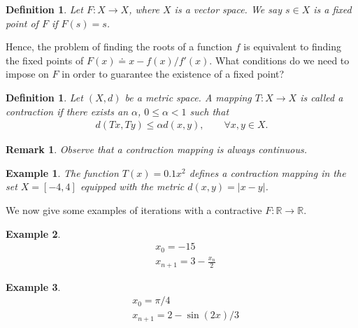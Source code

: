 \documentclass[12pt,reqno]{amsart}
\numberwithin{equation}{section}  %
\newcommand{\rr}{\mathbb{R}}
\newtheorem{definition}[theorem]{Definition}
\newtheorem{remark}[theorem]{Remark}
\newtheorem{example}{Example}[section]
\begin{document}
\begin{definition}
Let $F: X \to X$, where $X$ is a vector space. We say $s \in X$ is a 
\emph{fixed point} of $F$ if $F(s) = s$.
\end{definition}
Hence, the problem of finding the roots of a function $f$ is equivalent
to finding the fixed points of $F(x) \doteq x - f(x)/f'(x)$.
What conditions do we need to impose on $F$ in order to guarantee
the existence of a fixed point?
\begin{definition}
  Let $\left( X, d \right)$ be a metric space. A mapping $T: X \to X$ is called a
\emph{contraction} if there exists an $\alpha$, $0 \le \alpha <1$ such that
%
%
\begin{equation*}
	\begin{split}
		d(Tx, Ty) \le \alpha d(x,y), \qquad \forall x, y \in X.
	\end{split}
\end{equation*}
%
\end{definition}
%
\begin{remark}
	Observe that a contraction mapping is always continuous.
\end{remark}
%
%
\begin{example}
	The function $T(x) = 0.1x^2$ defines a contraction mapping in the set 
	$X = [-4, 4]$ equipped with the metric $d(x,y) = |x-y|$. 
\end{example}
We now give some examples of iterations with a contractive $F: \rr \to \rr$.
\begin{example}
\begin{align*}
& x_0 = -15
\\
& x_{n+1} = 3 - \frac{x_n}{2}
\end{align*}
\end{example}
\begin{example}
\begin{align*}
& x_0 = \pi/4
\\
& x_{n+1} = 2 - \sin(2x)/3
\end{align*}
\end{example} 
\end{document}
